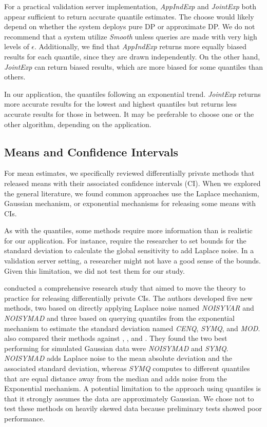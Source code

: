 For a practical validation server implementation, \textit{AppIndExp} and \textit{JointExp} both appear sufficient to return accurate quantile estimates. The choose would likely depend on whether the system deploys pure DP or approximate DP. We do not recommend that a system utilize \textit{Smooth} unless queries are made with very high levels of $\epsilon$. Additionally, we find that \textit{AppIndExp} returns more equally biased results for each quantile, since they are drawn independently. On the other hand, \textit{JointExp} can return biased results, which are more biased for some quantiles than others.

In our application, the quantiles following an exponential trend. \textit{JointExp} returns more accurate results for the lowest and highest quantiles but returns less accurate results for those in between. It may be preferable to choose one or the other algorithm, depending on the application.

\subsection{Means and Confidence Intervals}
For mean estimates, we specifically reviewed differentially private methods that released means with their associated confidence intervals (CI). When we explored the general literature, we found common approaches use the Laplace mechanism, Gaussian mechanism, or exponential mechanisms for releasing some means with CIs.

As with the quantiles, some methods require more information than is realistic for our application. For instance, \citet{karwa2017finite, bowen2020comparative, d2015differential, biswas2020coinpress} require the researcher to set bounds for the standard deviation to calculate the global sensitivity to add Laplace noise. In a validation server setting, a researcher might not have a good sense of the bounds. Given this limitation, we did not test them for our study.

\citet{du2020differentially} conducted a comprehensive research study that aimed to move the theory to practice for releasing differentially private CIs. The authors developed five new methods, two based on directly applying Laplace noise named \textit{NOISYVAR} and \textit{NOISYMAD} and three based on querying quantiles from the exponential mechanism  to estimate the standard deviation named \textit{CENQ}, \textit{SYMQ}, and \textit{MOD}. \citet{du2020differentially} also compared their methods against \citet{karwa2017finite}, \citet{d2015differential}, and \citet{brawner2018bootstrap}. They found the two best performing for simulated Gaussian data were \textit{NOISYMAD} and \textit{SYMQ}. \textit{NOISYMAD} adds Laplace noise to the mean absolute deviation and the associated standard deviation, whereas \textit{SYMQ} computes to different quantiles that are equal distance away from the median and adds noise from the Exponential mechanism. A potential limitation to the approach using quantiles is that it strongly assumes the data are approximately Gaussian. We chose not to test these methods on heavily skewed data because preliminary tests showed poor performance.


